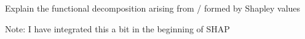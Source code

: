 Explain the functional decomposition arising from / formed by Shapley values

Note: I have integrated this a bit in the beginning of SHAP

